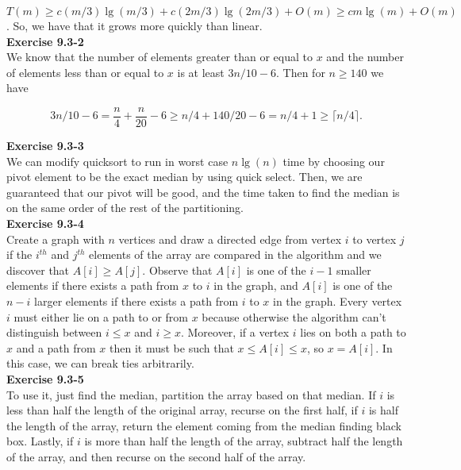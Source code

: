 \documentclass{article}
\begin{document}
$T(m) \ge c (m/3)\lg(m/3) + c(2m/3) \lg(2m/3) +O(m) \ge  c m \lg(m) +O(m)$. So, we have that it grows more quickly than linear.\\

\noindent\textbf{Exercise 9.3-2}\\

We know that the number of elements greater than or equal to $x$ and the number of elements less than or equal to $x$ is at least $3n/10 - 6$.  Then for $n\geq 140$ we have

\[3n/10-6 = \frac{n}{4} + \frac{n}{20} - 6 \geq n/4 + 140/20 - 6 = n/4 + 1 \geq \lceil n/4\rceil.\]

\noindent\textbf{ Exercise 9.3-3} \\
We can modify quicksort to run in worst case $n\lg(n)$ time by choosing our pivot element to be the exact median by using quick select. Then, we are guaranteed that our pivot will be good, and the time taken to find the median is on the same order of the rest of the partitioning.\\

\noindent\textbf{Exercise 9.3-4}\\

Create a graph with $n$ vertices and draw a directed edge from vertex $i$ to vertex $j$ if the $i^{th}$ and $j^{th}$ elements of the array are compared in the algorithm and we discover that $A[i] \geq A[j]$.  Observe that $A[i]$ is one of the $i-1$ smaller elements if there exists a path from $x$ to $i$ in the graph, and $A[i]$ is one of the $n-i$ larger elements if there exists a path from $i$ to $x$ in the graph.  Every vertex $i$ must either lie on a path to or from $x$ because otherwise the algorithm can't distinguish between $i \leq x$ and $i \geq x$.  Moreover, if a vertex $i$ lies on both a path to $x$ and a path from $x$ then it must be such that $x \leq A[i] \leq x$, so $x = A[i]$. In this case, we can break ties arbitrarily. \\


\noindent\textbf{ Exercise 9.3-5} \\
To use it, just find the median, partition the array based on that median. If $i$ is less than half the length of the original array, recurse on the first half, if $i$ is half the length of the array, return the element coming from the median finding black box. Lastly, if $i$ is more than half the length of the array, subtract half the length of the array, and then recurse on the second half of the array.\\
\end{document}
